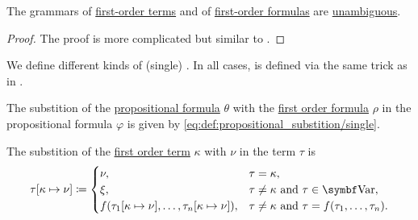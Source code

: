 \begin{proposition}\label{thm:propositional_formulas_are_unambiguous}
  The grammars of \hyperref[def:first_order_language/term]{first-order terms} and of \hyperref[def:first_order_language/formula]{first-order formulas} are \hyperref[def:grammar_derivation/ambiguity]{unambiguous}.
\end{proposition}
\begin{proof}
  The proof is more complicated but similar to .
\end{proof}

\begin{definition}\label{def:first_order_substition}
  We define different kinds of (single) . In all cases,  is defined via the same trick as in .

  \begin{DefEnum}
     The substition of the \hyperref[def:propositional_language/formula]{propositional formula} \( \theta \) with the \hyperref[def:first_order_language/formula]{first order formula} \( \rho \) in the propositional formula \( \varphi \) is given by \eqref{eq:def:propositional_substition/single}.

     The substition of the \hyperref[def:first_order_language/term]{first order term} \( \kappa \) with \( \nu \) in the term \( \tau \) is
    \begin{equation}\label{eq:def:first_order_substition/term_in_term}
      \tau[\kappa \mapsto \nu] \coloneqq \begin{cases}
        \nu,                                                               &\tau = \kappa, \\
        \xi,                                                               &\tau \neq \kappa \T{and} \tau \in \Bold{Var}, \\
        f(\tau_1[\kappa \mapsto \nu], \ldots, \tau_n[\kappa \mapsto \nu]), &\tau \neq \kappa \T{and} \tau = f(\tau_1, \ldots, \tau_n).
      \end{cases}
    \end{equation}


\end{DefEnum}
\end{definition}
